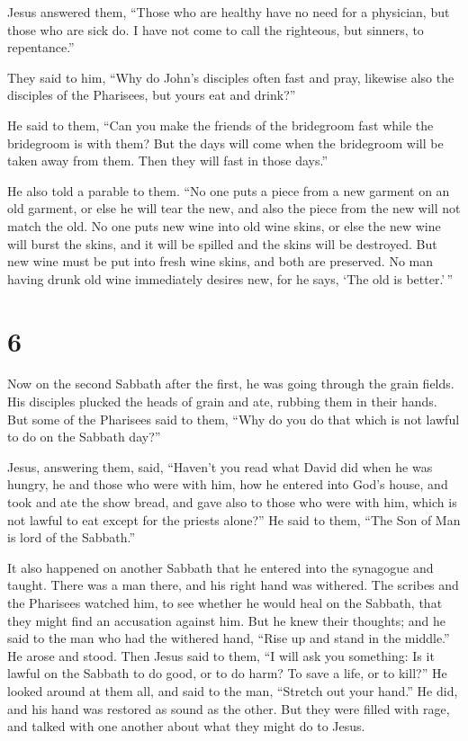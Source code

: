  Jesus answered them, ``Those who are healthy have no
need for a physician, but those who are sick do.  I have
not come to call the righteous, but sinners, to repentance.''

 They said to him, ``Why do John's disciples often fast
and pray, likewise also the disciples of the Pharisees, but yours eat
and drink?''

 He said to them, ``Can you make the friends of the
bridegroom fast while the bridegroom is with them?  But
the days will come when the bridegroom will be taken away from them.
Then they will fast in those days.''

 He also told a parable to them. ``No one puts a piece
from a new garment on an old garment, or else he will tear the new, and
also the piece from the new will not match the old.  No
one puts new wine into old wine skins, or else the new wine will burst
the skins, and it will be spilled and the skins will be destroyed.
 But new wine must be put into fresh wine skins, and both
are preserved.  No man having drunk old wine immediately
desires new, for he says, `The old is better.'\,''

\hypertarget{section-5}{%
\section{6}\label{section-5}}

 Now on the second Sabbath after the first, he was going
through the grain fields. His disciples plucked the heads of grain and
ate, rubbing them in their hands.  But some of the
Pharisees said to them, ``Why do you do that which is not lawful to do
on the Sabbath day?''

 Jesus, answering them, said, ``Haven't you read what
David did when he was hungry, he and those who were with him,
 how he entered into God's house, and took and ate the
show bread, and gave also to those who were with him, which is not
lawful to eat except for the priests alone?''  He said to
them, ``The Son of Man is lord of the Sabbath.''

 It also happened on another Sabbath that he entered into
the synagogue and taught. There was a man there, and his right hand was
withered.  The scribes and the Pharisees watched him, to
see whether he would heal on the Sabbath, that they might find an
accusation against him.  But he knew their thoughts; and
he said to the man who had the withered hand, ``Rise up and stand in the
middle.'' He arose and stood.  Then Jesus said to them,
``I will ask you something: Is it lawful on the Sabbath to do good, or
to do harm? To save a life, or to kill?''  He looked
around at them all, and said to the man, ``Stretch out your hand.'' He
did, and his hand was restored as sound as the other. 
But they were filled with rage, and talked with one another about what
they might do to Jesus.

